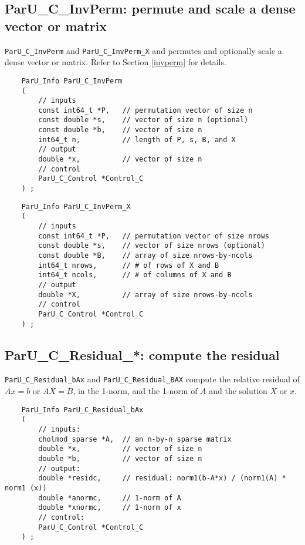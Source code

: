 \documentclass[12pt]{article}
\begin{document}
\subsection{{\sf ParU\_C\_InvPerm}: permute and scale a dense vector or matrix}

    \verb'ParU_C_InvPerm' and \verb'ParU_C_InvPerm_X' and permutes and
    optionally scale a dense vector or matrix.  Refer to Section \ref{invperm}
    for details.

    {\footnotesize
    \begin{verbatim}
    ParU_Info ParU_C_InvPerm
    (
        // inputs
        const int64_t *P,   // permutation vector of size n
        const double *s,    // vector of size n (optional)
        const double *b,    // vector of size n
        int64_t n,          // length of P, s, B, and X
        // output
        double *x,          // vector of size n
        // control
        ParU_C_Control *Control_C
    ) ; \end{verbatim} }

    {\footnotesize
    \begin{verbatim}
    ParU_Info ParU_C_InvPerm_X
    (
        // inputs
        const int64_t *P,   // permutation vector of size nrows
        const double *s,    // vector of size nrows (optional)
        const double *B,    // array of size nrows-by-ncols
        int64_t nrows,      // # of rows of X and B
        int64_t ncols,      // # of columns of X and B
        // output
        double *X,          // array of size nrows-by-ncols
        // control
        ParU_C_Control *Control_C
    ) ; \end{verbatim} }

\subsection{{\sf ParU\_C\_Residual\_*}: compute the residual}

    \verb'ParU_C_Residual_bAx' and \verb'ParU_C_Residual_BAX' compute the
    relative residual of $Ax=b$ or $AX=B$, in the 1-norm, and the 1-norm of $A$
    and the solution $X$ or $x$.

    {\footnotesize
    \begin{verbatim}
    ParU_Info ParU_C_Residual_bAx
    (
        // inputs:
        cholmod_sparse *A,  // an n-by-n sparse matrix
        double *x,          // vector of size n
        double *b,          // vector of size n
        // output:
        double *residc,     // residual: norm1(b-A*x) / (norm1(A) * norm1 (x))
        double *anormc,     // 1-norm of A
        double *xnormc,     // 1-norm of x
        // control:
        ParU_C_Control *Control_C
    ) ; \end{verbatim} }
\end{document}
